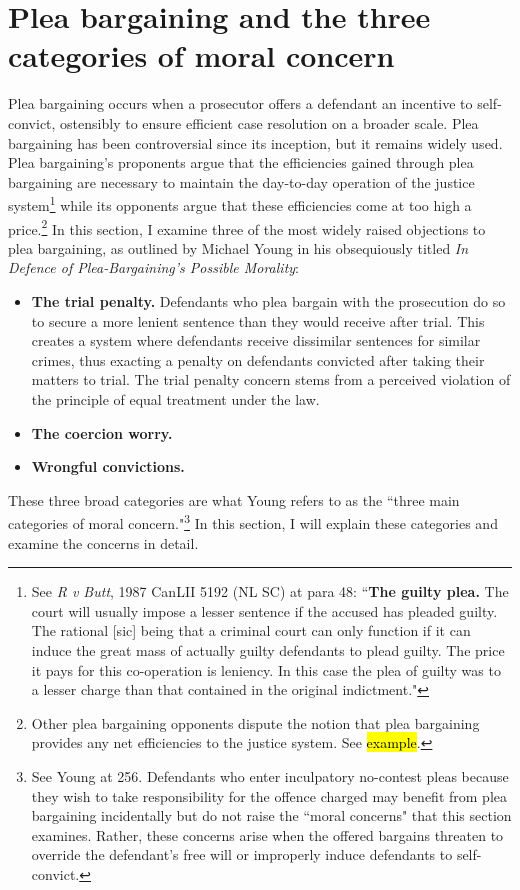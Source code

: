 \section{Plea bargaining and the three categories of moral concern}

Plea bargaining occurs when a prosecutor offers a defendant an incentive to self-convict, ostensibly to ensure efficient case resolution on a broader scale. Plea bargaining has been controversial since its inception, but it remains widely used. Plea bargaining's proponents argue that the efficiencies gained through plea bargaining are necessary to maintain the day-to-day operation of the justice system\footnote{See \textit{R v Butt}, 1987 CanLII 5192 (NL SC) at para 48: ``\textbf{The guilty plea.} The court will usually impose a lesser sentence if the accused has pleaded guilty. The rational [sic] being that a criminal court can only function if it can induce the great mass of actually guilty defendants to plead guilty. The price it pays for this co-operation is leniency. In this case the plea of guilty was to a lesser charge than that contained in the original indictment."} while its opponents argue that these efficiencies come at too high a price.\footnote{Other plea bargaining opponents dispute the notion that plea bargaining provides any net efficiencies to the justice system. See \hl{example}.} In this section, I examine three of the most widely raised objections to plea bargaining, as outlined by Michael Young in his obsequiously titled \textit{In Defence of Plea-Bargaining's Possible Morality}:

\begin{itemize}
    \item \textbf{The trial penalty.} Defendants who plea bargain with the prosecution do so to secure a more lenient sentence than they would receive after trial. This creates a system where defendants receive dissimilar sentences for similar crimes, thus exacting a penalty on defendants convicted after taking their matters to trial. The trial penalty concern stems from a perceived violation of the principle of equal treatment under the law.
    \item \textbf{The coercion worry.} 
    \item \textbf{Wrongful convictions.} 
\end{itemize}

These three broad categories are what Young refers to as the ``three main categories of moral concern."\footnote{See Young at 256. Defendants who enter inculpatory no-contest pleas because they wish to take responsibility for the offence charged may benefit from plea bargaining incidentally but do not raise the ``moral concerns" that this section examines. Rather, these concerns arise when the offered bargains threaten to override the defendant's free will or improperly induce defendants to self-convict.} In this section, I will explain these categories and examine the concerns in detail. 

